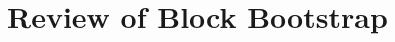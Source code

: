 \documentclass[12pt, letterpaper, titlepage]{article}
\begin{document}





\section{Review of Block Bootstrap}
\label{sec:blkbootreview}
\end{document}
